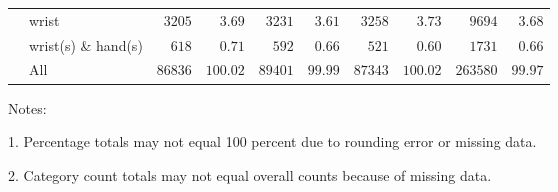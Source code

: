 \documentclass[9pt, oneside]{article}   	%
\begin{document}
\begin{longtable}{p{1.8in}p{2.2in}cccccccc}
 & wrist  & $\phantom{0}3205$ & $\phantom{00}3.69$ & $\phantom{0}3231$ & $\phantom{0}3.61$ & $\phantom{0}3258$ & $\phantom{00}3.73$ & $\phantom{00}9694$ & $\phantom{0}3.68$ \\
 & wrist(s) \& hand(s)  & $\phantom{00}618$ & $\phantom{00}0.71$ & $\phantom{00}592$ & $\phantom{0}0.66$ & $\phantom{00}521$ & $\phantom{00}0.60$ & $\phantom{00}1731$ & $\phantom{0}0.66$ \\
\cline{1-1} \cline{2-2} \cline{3-3} \cline{4-4} \cline{5-5} \cline{6-6} \cline{7-7} \cline{8-8} \cline{9-9} \cline{10-10} %
 & All  & $86836$ & $100.02$ & $89401$ & $99.99$ & $87343$ & $100.02$ & $263580$ & $99.97$ \\
\hline 
\end{longtable}


    \begin{tablenotes}
      \small
      Notes: 
      \\
      \item 1. Percentage totals may not equal 100 percent due to rounding error or missing data.\\
      \item 2. Category count totals may not equal overall counts because of missing data.
    \end{tablenotes}








\pagebreak
\end{document}
